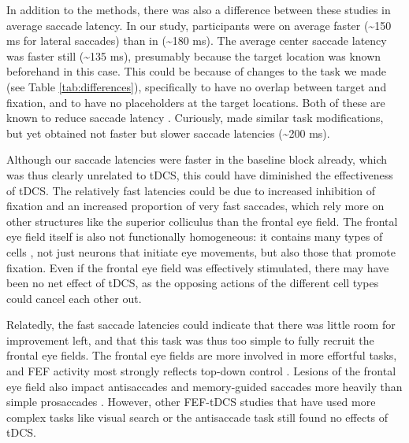 \documentclass[11pt,english,]{memoir}
\begin{document}
In addition to the methods, there was also a difference between these studies in average saccade latency. In our study, participants were on average faster (\textasciitilde{}150 ms for lateral saccades) than in \textcite{Kanai2012} (\textasciitilde{}180 ms). The average center saccade latency was faster still (\textasciitilde{}135 ms), presumably because the target location was known beforehand in this case. This could be because of changes to the task we made (see Table \ref{tab:differences}), specifically to have no overlap between target and fixation, and to have no placeholders at the target locations. Both of these are known to reduce saccade latency \autocite{Sumner2011}. Curiously, \textcite{Chen2017} made similar task modifications, but yet obtained not faster but slower saccade latencies (\textasciitilde{}200 ms).

Although our saccade latencies were faster in the baseline block already, which was thus clearly unrelated to tDCS, this could have diminished the effectiveness of tDCS. The relatively fast latencies could be due to increased inhibition of fixation and an increased proportion of very fast saccades, which rely more on other structures like the superior colliculus \autocites{Munoz1992}{Munoz2002} than the frontal eye field. The frontal eye field itself is also not functionally homogeneous: it contains many types of cells \autocite{Lowe2017}, not just neurons that initiate eye movements, but also those that promote fixation. Even if the frontal eye field was effectively stimulated, there may have been no net effect of tDCS, as the opposing actions of the different cell types could cancel each other out.

Relatedly, the fast saccade latencies could indicate that there was little room for improvement left, and that this task was thus too simple to fully recruit the frontal eye fields. The frontal eye fields are more involved in more effortful tasks, and FEF activity most strongly reflects top-down control \autocite{Schafer2011}. Lesions of the frontal eye field also impact antisaccades and memory-guided saccades more heavily than simple prosaccades \autocite{Rivaud1994}. However, other FEF-tDCS studies that have used more complex tasks like visual search \autocites{Ball2013}{Ellison2017} or the antisaccade task \autocite{Chen2017} still found no effects of tDCS.
\end{document}
